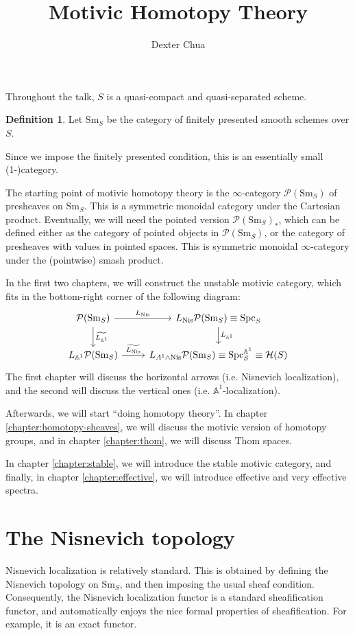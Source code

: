 \documentclass{shortart}
\title{Motivic Homotopy Theory}
\author{Dexter Chua}
\theoremstyle{definition}
\newtheorem{defi}[thm]{Definition}
\newcommand\Sm{\mathrm{Sm}}
\newcommand\Spc{\mathrm{Spc}}
\newcommand\Nis{\mathrm{Nis}}
\newcommand\Pre{\mathcal{P}}
\renewcommand\H{\mathcal{H}}
\newcommand\A{\mathbb{A}}
\begin{document}
Throughout the talk, $S$ is a quasi-compact and quasi-separated scheme.

\begin{defi}
  Let $\Sm_S$ be the category of finitely presented smooth schemes over $S$.
\end{defi}
Since we impose the finitely presented condition, this is an essentially small (1-)category.

The starting point of motivic homotopy theory is the $\infty$-category $\Pre(\Sm_S)$ of presheaves on $\Sm_S$. This is a symmetric monoidal category under the Cartesian product. Eventually, we will need the pointed version $\Pre(\Sm_S)_*$, which can be defined either as the category of pointed objects in $\Pre(\Sm_S)$, or the category of presheaves with values in pointed spaces. This is symmetric monoidal $\infty$-category under the (pointwise) smash product.

In the first two chapters, we will construct the unstable motivic category, which fits in the bottom-right corner of the following diagram:
\[
  \begin{tikzcd}
    \Pre(\Sm_S) \ar[r, "L_{\Nis}"] \ar[d, "\widetilde{L_{\A^1}}"] & L_{\Nis} \Pre(\Sm_S) \equiv \Spc_S \ar[d, "L_{\A^1}"]\\
    L_{\A^1} \Pre(\Sm_S) \ar[r, "\widetilde{L_{\Nis}}"] & L_{A^1 \wedge \Nis} \Pre(\Sm_S) \equiv \Spc_S^{\A^1} \equiv \H(S)
  \end{tikzcd}
\]
The first chapter will discuss the horizontal arrows (i.e. Nisnevich localization), and the second will discuss the vertical ones (i.e. $\A^1$-localization).

Afterwards, we will start ``doing homotopy theory''. In chapter \ref{chapter:homotopy-sheaves}, we will discuss the motivic version of homotopy groups, and in chapter \ref{chapter:thom}, we will discuss Thom spaces.

In chapter \ref{chapter:stable}, we will introduce the stable motivic category, and finally, in chapter \ref{chapter:effective}, we will introduce effective and very effective spectra.

\section{The Nisnevich topology}
Nisnevich localization is relatively standard. This is obtained by defining the Nisnevich topology on $\Sm_S$, and then imposing the usual sheaf condition. Consequently, the Nisnevich localization functor is a standard sheafification functor, and automatically enjoys the nice formal properties of sheafification. For example, it is an exact functor.
\end{document}
